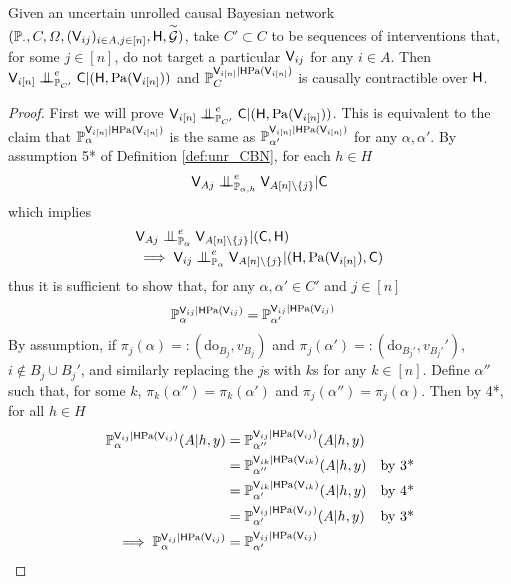 \begin{theorem}\label{th:causal_contractibility_cbn}
Given an uncertain unrolled causal Bayesian network $(\mathbb{P}_\cdot,C,\Omega,(\mathsf{V}_{ij})_{i\in A,j\in [n]},\mathsf{H},\overset{\sim}{\mathcal{G}})$, take $C'\subset C$ to be sequences of interventions that, for some $j\in [n]$, do not target a particular $\mathsf{V}_{ij}$ for any $i\in A$. Then $\RV{V}_{i[n]}\CI^e_{\prob{P}_{C'}}\RV{C}|(\RV{H},\mathrm{Pa}(\RV{V}_{i [n]}))$ and $\mathbb{P}_C^{\mathsf{V}_{i[n]}|\mathsf{H}\mathrm{Pa}(\mathsf{V}_{i [n]})}$ is causally contractible over $\mathsf{H}$. 
\end{theorem}

\begin{proof}
First we will prove $\RV{V}_{i[n]}\CI^e_{\prob{P}_{C'}}\RV{C}|(\RV{H},\mathrm{Pa}(\RV{V}_{i [n]}))$. This is equivalent to the claim that $\mathbb{P}_\alpha^{\mathsf{V}_{i[n]}|\mathsf{H}\mathrm{Pa}(\mathsf{V}_{i[n]})}$ is the same as $\mathbb{P}_{\alpha'}^{\mathsf{V}_{i[n]}|\mathsf{H}\mathrm{Pa}(\mathsf{V}_{i[n]})}$ for any $\alpha,\alpha'$. By assumption 5* of Definition \ref{def:unr_CBN}, for each $h\in H$
\begin{align}
    \RV{V}_{Aj}\CI^e_{\prob{P}_{\alpha,h}} \RV{V}_{A [n]\setminus\{j\}} |\RV{C}
\end{align}
which implies
\begin{align}
    &\RV{V}_{Aj}\CI^e_{\prob{P}_{\alpha}} \RV{V}_{A [n]\setminus\{j\}} |(\RV{C},\RV{H})\\
    &\implies \RV{V}_{ij}\CI^e_{\prob{P}_{\alpha}} \RV{V}_{A [n]\setminus\{j\}} |(\RV{H},\mathrm{Pa}(\RV{V}_{i[n]}),\RV{C})\label{eq:mutual_conditional_independence}
\end{align}
thus it is sufficient to show that, for any $\alpha,\alpha'\in C'$ and $j\in[n]$
\begin{align}
    \mathbb{P}_\alpha^{\mathsf{V}_{ij}|\mathsf{H}\mathrm{Pa}(\mathsf{V}_{ij})} &= \mathbb{P}_{\alpha'}^{\mathsf{V}_{ij}|\mathsf{H}\mathrm{Pa}(\mathsf{V}_{ij})}
\end{align}
By assumption, if $\pi_j(\alpha) =: (\mathrm{do}_{B_j},v_{B_j})$ and $\pi_j(\alpha') =: (\mathrm{do}_{B_j'},v_{B_j'}')$, $i\not\in B_j\cup B_j'$, and similarly replacing the $j$s with $k$s for any $k\in [n]$. Define $\alpha''$ such that, for some $k$, $\pi_k(\alpha'')=\pi_k(\alpha')$ and $\pi_j(\alpha'')=\pi_j(\alpha)$. Then by 4*, for all $h\in H$
\begin{align}
    \mathbb{P}_{\alpha}^{\mathsf{V}_{ij}|\mathsf{H}\mathrm{Pa}(\mathsf{V}_{ij})}(A|h,y) &= \mathbb{P}_{\alpha''}^{\mathsf{V}_{ij}|\mathsf{H}\mathrm{Pa}(\mathsf{V}_{ij})}(A|h,y)\\
    &= \mathbb{P}_{\alpha''}^{\mathsf{V}_{ik}|\mathsf{H}\mathrm{Pa}(\mathsf{V}_{ik})}(A|h,y)&\text{by 3*}\\
    &= \mathbb{P}_{\alpha'}^{\mathsf{V}_{ik}|\mathsf{H}\mathrm{Pa}(\mathsf{V}_{ik})}(A|h,y)&\text{by 4*}\\
    &= \mathbb{P}_{\alpha'}^{\mathsf{V}_{ij}|\mathsf{H}\mathrm{Pa}(\mathsf{V}_{ij})}(A|h,y)&\text{by 3*}\\
    \implies \mathbb{P}_\alpha^{\mathsf{V}_{ij}|\mathsf{H}\mathrm{Pa}(\mathsf{V}_{ij})} &= \mathbb{P}_{\alpha'}^{\mathsf{V}_{ij}|\mathsf{H}\mathrm{Pa}(\mathsf{V}_{ij})}
\end{align}


\end{proof}
